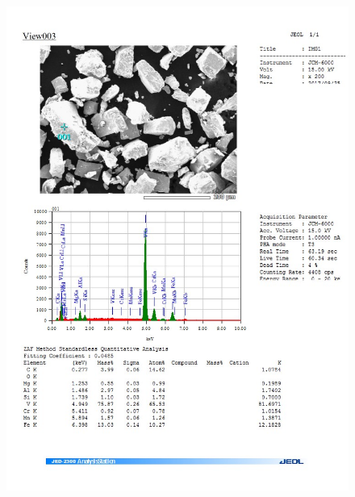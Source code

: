 \documentclass[12pt]{article}
\begin{document}
\begin{figure}[H]
	\includegraphics[width = \linewidth]{./pictures/dot_spec_1.jpg}
\end{figure}
\end{document}
